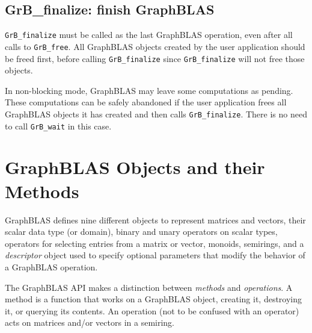 \documentclass[12pt]{article}
\begin{document}
\subsection{{\sf GrB\_finalize:} finish GraphBLAS} %
\label{finalize}

\verb'GrB_finalize' must be called as the last GraphBLAS operation, even after
all calls to \verb'GrB_free'.  All GraphBLAS objects created by the user
application should be freed first, before calling \verb'GrB_finalize' since
\verb'GrB_finalize' will not free those objects.

In non-blocking mode, GraphBLAS may leave some computations as pending.  These
computations can be safely abandoned if the user application frees all
GraphBLAS objects it has created and then calls \verb'GrB_finalize'.  There is
no need to call \verb'GrB_wait' in this case.

\newpage
\section{GraphBLAS Objects and their Methods} %
\label{objects}

GraphBLAS defines nine different objects to represent matrices and vectors,
their scalar data type (or domain), binary and unary operators on scalar types,
operators for selecting entries from a matrix or vector,
monoids, semirings, and a {\em descriptor} object used to specify optional
parameters that modify the behavior of a GraphBLAS operation.

The GraphBLAS API makes a distinction between {\em methods} and {\em
operations}.  A method is a function that works on a GraphBLAS object, creating
it, destroying it, or querying its contents.  An operation (not to be confused
with an operator) acts on matrices and/or vectors in a semiring.
\end{document}
